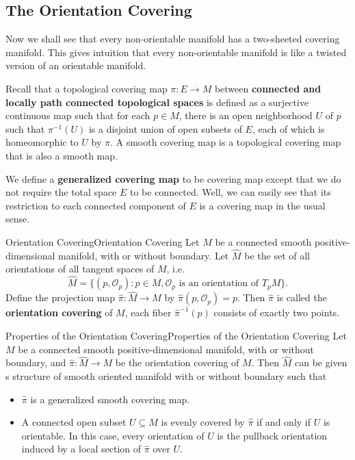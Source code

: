 \documentclass[../main.tex]{subfiles}
\begin{document}
\subsection{The Orientation Covering}
Now we shall see that every non-orientable manifold has a two-sheeted covering manifold. This gives intuition that every non-orientable manifold is like a twisted version of an orientable manifold.

Recall that a topological covering map $\pi: E \to M$ between \textbf{connected and locally path connected topological spaces} is defined as a surjective continuous map such that for each $p \in M$, there is an open neighborhood $U$ of $p$ such that $\pi^{-1}(U)$ is a disjoint union of open subsets of $E$, each of which is homeomorphic to $U$ by $\pi$. A smooth covering map is a topological covering map that is also a smooth map.

We define a \textbf{generalized covering map} to be covering map except that we do not require the total space $E$ to be connected. Well, we can easily see that its restriction to each connected component of $E$ is a covering map in the usual sense.

\begin{definition}{Orientation Covering}{Orientation Covering}
  Let $M$ be a connected smooth positive-dimensional manifold, with or without boundary. Let $\hat{M}$ be the set of all orientations of all tangent spaces of $M$, i.e.
  \begin{equation*}
    \hat{M} = \{(p, \mathcal{O}_p) : p \in M, \mathcal{O}_p \text{ is an orientation of } T_pM\}.
  \end{equation*}
  Define the projection map $\hat{\pi} : \hat{M} \to M$ by $\hat{\pi}(p, \mathcal{O}_p) = p$. Then $\hat{\pi}$ is called the \textbf{orientation covering} of $M$, each fiber $\hat{\pi}^{-1}(p)$ consists of exactly two points.
\end{definition}

\begin{proposition}{Properties of the Orientation Covering}{Properties of the Orientation Covering}
  Let $M$ be a connected smooth positive-dimensional manifold, with or without boundary, and $\hat{\pi} : \hat{M} \to M$ be the orientation covering of $M$. Then $\hat{M}$ can be given s structure of smooth oriented manifold with or without boundary such that
  \begin{itemize}
    \item $\hat{\pi}$ is a generalized smooth covering map.
    \item A connected open subset $U \subseteq M$ is evenly covered by $\hat{\pi}$ if and only if $U$ is orientable. In this case, every orientation of $U$ is the pullback orientation induced by a local section of $\hat{\pi}$ over $U$.
  \end{itemize}
\end{proposition}
\end{document}

